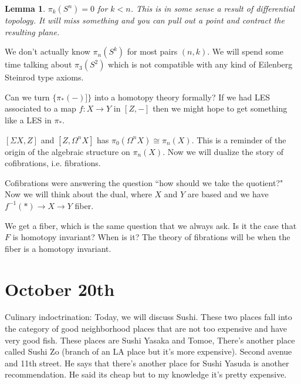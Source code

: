 \documentclass[10pt]{article}
\newtheorem{lemma}[theorem]{Lemma}
\theoremstyle{definition}
\begin{document}
	\begin{lemma}{1}
		$\pi_k(S^n)=0$ for $k<n$. This is in some sense a result of differential topology. It will miss something and you can pull out a point and contract the resulting plane. 
	\end{lemma}
	We don't actually know $\pi_n(S^k)$ for most pairs $(n,k)$. We will spend some time talking about $\pi_3(S^2)$ which is not compatible with any kind of Eilenberg Steinrod type axioms.  
	
	Can we turn $\{\pi_*(-)]\}$ into a homotopy theory formally? If we had LES associated to a map $f:X\to Y$ in $[Z,-]$ then we might hope to get something like a LES in $\pi_*$. 
	
	$[\Sigma X,Z]$ and $[Z,\Omega^n X]$ has $\pi_0(\Omega^n X)\cong \pi_n(X)$. This is a reminder of the origin of the algebraic structure on $\pi_n(X)$. Now we will dualize the story of cofibrations, i.e. fibrations. 
	
	Cofibrations were answering the question ``how should we take the quotient?" Now we will think about the dual, where $X$ and $Y$ are based and we have $f^{-1}(\ast)\to X\to Y$ fiber. 
	\begin{center}
	\end{center}
	We get a fiber, which is the same question that we always ask. Is it the case that $F$ is homotopy invariant?  When is it?  The theory of fibrations will be when the fiber is a homotopy invariant. 
	\begin{center}
	\end{center}
\section{October 20th}
Culinary indoctrination: Today, we will discuss Sushi. These two places fall into the category of good neighborhood places that are not too expensive and have very good fish. These places are Sushi Yasaka and Tomoe, There's another place called Sushi Zo (branch of an LA place but it's more expensive). Second avenue and 11th street. He says that there's another place for Sushi Yasuda is another recommendation. He said its cheap but to my knowledge it's pretty expensive. 
\end{document}

